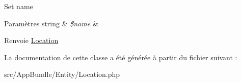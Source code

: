 Set name


\begin{DoxyParams}[1]{Paramètres}
string & {\em \$name} & \\
\hline
\end{DoxyParams}
\begin{DoxyReturn}{Renvoie}
\hyperlink{classAppBundle_1_1Entity_1_1Location}{Location} 
\end{DoxyReturn}


La documentation de cette classe a été générée à partir du fichier suivant \+:\begin{DoxyCompactItemize}
\item 
src/\+App\+Bundle/\+Entity/Location.\+php\end{DoxyCompactItemize}
